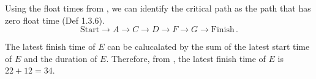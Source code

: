 \begin{subquestions}
\begin{subsubquestions}

\subsubquestion

\begin{subsubsubquestions}

\subsubsubquestion

Using the float times from , we can identify the critical path as the path that has zero float time (Def 1.3.6).
\begin{equation}
	\text{Start} \rightarrow A \rightarrow C \rightarrow D \rightarrow F \rightarrow G \rightarrow \text{Finish} \,.
\end{equation}	


\subsubsubquestion

The latest finish time of $E$ can be calucalated by the sum of the latest start time of $E$ and the duration of $E$. Therefore, from , the latest finish time of $E$ is $22 + 12 = 34$.

\end{subsubsubquestions}

\end{subsubquestions}

\end{subquestions}

